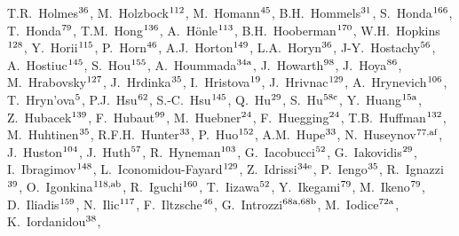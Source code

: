 \begin{flushleft}
T.R.~Holmes$^\textrm{\scriptsize 36}$,    
M.~Holzbock$^\textrm{\scriptsize 112}$,    
M.~Homann$^\textrm{\scriptsize 45}$,    
B.H.~Hommels$^\textrm{\scriptsize 31}$,    
S.~Honda$^\textrm{\scriptsize 166}$,    
T.~Honda$^\textrm{\scriptsize 79}$,    
T.M.~Hong$^\textrm{\scriptsize 136}$,    
A.~H\"{o}nle$^\textrm{\scriptsize 113}$,    
B.H.~Hooberman$^\textrm{\scriptsize 170}$,    
W.H.~Hopkins$^\textrm{\scriptsize 128}$,    
Y.~Horii$^\textrm{\scriptsize 115}$,    
P.~Horn$^\textrm{\scriptsize 46}$,    
A.J.~Horton$^\textrm{\scriptsize 149}$,    
L.A.~Horyn$^\textrm{\scriptsize 36}$,    
J-Y.~Hostachy$^\textrm{\scriptsize 56}$,    
A.~Hostiuc$^\textrm{\scriptsize 145}$,    
S.~Hou$^\textrm{\scriptsize 155}$,    
A.~Hoummada$^\textrm{\scriptsize 34a}$,    
J.~Howarth$^\textrm{\scriptsize 98}$,    
J.~Hoya$^\textrm{\scriptsize 86}$,    
M.~Hrabovsky$^\textrm{\scriptsize 127}$,    
J.~Hrdinka$^\textrm{\scriptsize 35}$,    
I.~Hristova$^\textrm{\scriptsize 19}$,    
J.~Hrivnac$^\textrm{\scriptsize 129}$,    
A.~Hrynevich$^\textrm{\scriptsize 106}$,    
T.~Hryn'ova$^\textrm{\scriptsize 5}$,    
P.J.~Hsu$^\textrm{\scriptsize 62}$,    
S.-C.~Hsu$^\textrm{\scriptsize 145}$,    
Q.~Hu$^\textrm{\scriptsize 29}$,    
S.~Hu$^\textrm{\scriptsize 58c}$,    
Y.~Huang$^\textrm{\scriptsize 15a}$,    
Z.~Hubacek$^\textrm{\scriptsize 139}$,    
F.~Hubaut$^\textrm{\scriptsize 99}$,    
M.~Huebner$^\textrm{\scriptsize 24}$,    
F.~Huegging$^\textrm{\scriptsize 24}$,    
T.B.~Huffman$^\textrm{\scriptsize 132}$,    
M.~Huhtinen$^\textrm{\scriptsize 35}$,    
R.F.H.~Hunter$^\textrm{\scriptsize 33}$,    
P.~Huo$^\textrm{\scriptsize 152}$,    
A.M.~Hupe$^\textrm{\scriptsize 33}$,    
N.~Huseynov$^\textrm{\scriptsize 77,af}$,    
J.~Huston$^\textrm{\scriptsize 104}$,    
J.~Huth$^\textrm{\scriptsize 57}$,    
R.~Hyneman$^\textrm{\scriptsize 103}$,    
G.~Iacobucci$^\textrm{\scriptsize 52}$,    
G.~Iakovidis$^\textrm{\scriptsize 29}$,    
I.~Ibragimov$^\textrm{\scriptsize 148}$,    
L.~Iconomidou-Fayard$^\textrm{\scriptsize 129}$,    
Z.~Idrissi$^\textrm{\scriptsize 34e}$,    
P.~Iengo$^\textrm{\scriptsize 35}$,    
R.~Ignazzi$^\textrm{\scriptsize 39}$,    
O.~Igonkina$^\textrm{\scriptsize 118,ab}$,    
R.~Iguchi$^\textrm{\scriptsize 160}$,    
T.~Iizawa$^\textrm{\scriptsize 52}$,    
Y.~Ikegami$^\textrm{\scriptsize 79}$,    
M.~Ikeno$^\textrm{\scriptsize 79}$,    
D.~Iliadis$^\textrm{\scriptsize 159}$,    
N.~Ilic$^\textrm{\scriptsize 117}$,    
F.~Iltzsche$^\textrm{\scriptsize 46}$,    
G.~Introzzi$^\textrm{\scriptsize 68a,68b}$,    
M.~Iodice$^\textrm{\scriptsize 72a}$,    
K.~Iordanidou$^\textrm{\scriptsize 38}$,    

\end{flushleft}
